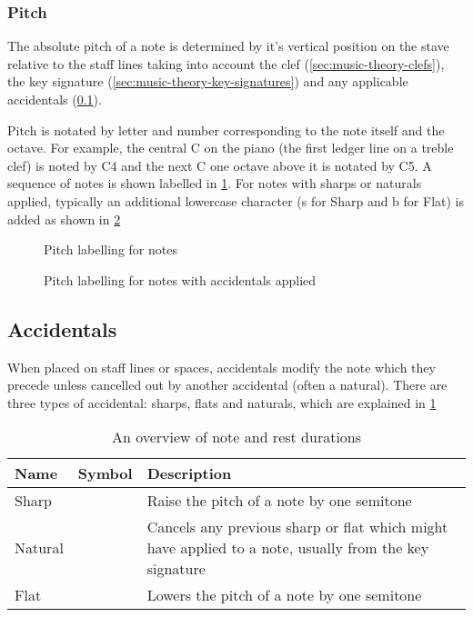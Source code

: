 \subsubsection{Pitch}
\label{sec:music-theory-pitch}

The absolute pitch of a note is determined by it's vertical position on the stave relative to the staff lines taking into account the clef (\cref{sec:music-theory-clefs}), the key signature (\cref{sec:music-theory-key-signatures}) and any applicable accidentals (\cref{sec:music-theory-accidentals}).

Pitch is notated by letter and number corresponding to the note itself and the octave. For example, the central C on the piano (the first ledger line on a treble clef) is noted by C4 and the next C one octave above it is notated by C5. A sequence of notes is shown labelled in \cref{fig:music-theory-pitch-labels}. For notes with sharps or naturals applied, typically an additional lowercase character (s for Sharp and b for Flat) is added as shown in \cref{fig:music-theory-pitch-labels-accidentals}

\begin{figure}[H]
  \centering
  \caption{Pitch labelling for notes}
  \label{fig:music-theory-pitch-labels}
\end{figure}


\begin{figure}[H]
  \centering
  \caption{Pitch labelling for notes with accidentals applied}
  \label{fig:music-theory-pitch-labels-accidentals}
\end{figure}


\subsection{Accidentals}
\label{sec:music-theory-accidentals}
When placed on staff lines or spaces, accidentals modify the note which they precede unless cancelled out by another accidental (often a natural). There are three types of accidental: sharps, flats and naturals, which are explained in \cref{table:note-accidentals}

\begin{table}[H]
    \renewcommand{\arraystretch}{1.8}
    \centering
    \begin{tabularx}{\textwidth}{ llX }
        \toprule

        Name & Symbol & Description \\
        \midrule
        Sharp & & Raise the pitch of a note by one semitone\\
        Natural & & Cancels any previous sharp or flat which might have applied to a note, usually from the key signature \\
        Flat & & Lowers the pitch of a note by one semitone \\
        \bottomrule
    \end{tabularx}
    \caption{An overview of note and rest durations}
    \label{table:note-accidentals}
\end{table}

